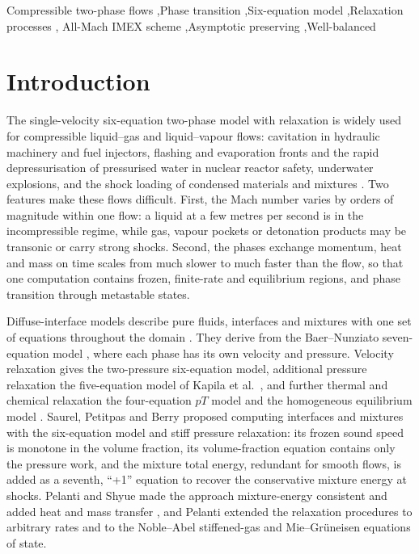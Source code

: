\begin{keyword}
Compressible two-phase flows \sep Phase transition \sep Six-equation model \sep Relaxation processes \sep
All-Mach IMEX scheme \sep Asymptotic preserving \sep Well-balanced
\end{keyword}

\section{Introduction}
\label{sec:intro}

The single-velocity six-equation two-phase model with relaxation \cite{SPB2009,PelantiShyue2014,Pelanti2022} is widely
used for compressible liquid--gas and liquid--vapour flows: cavitation in hydraulic machinery and fuel injectors,
flashing and evaporation fronts and the rapid depressurisation of pressurised water in nuclear reactor safety,
underwater explosions, and the shock loading of condensed materials and mixtures
\cite{SaurelPetitpasAbgrall2008,Bartak1990,PelantiShyue2019,Chiapolino2017,DeLorenzo2018,DeLorenzo2019,Schmidmayer2020,SaurelPantano2018}.
Two features make these flows difficult. First, the Mach number varies by orders of magnitude within one flow: a liquid
at a few metres per second is in the incompressible regime, while gas, vapour pockets or detonation products may be
transonic or carry strong shocks. Second, the phases exchange momentum, heat and mass on time scales from much slower to
much faster than the flow, so that one computation contains frozen, finite-rate and equilibrium regions, and phase
transition through metastable states.

Diffuse-interface models describe pure fluids, interfaces and mixtures with one set of equations throughout the domain
\cite{SaurelAbgrall1999a,AbgrallKarni2001,SaurelPantano2018}. They derive from the Baer--Nunziato seven-equation model
\cite{BaerNunziato1986}, where each phase has its own velocity and pressure. Velocity relaxation gives the two-pressure
six-equation model, additional pressure relaxation the five-equation model of Kapila et al.\
\cite{Kapila2001,MurroneGuillard2005,AllaireClercKokh2002}, and further thermal and chemical relaxation the
four-equation $pT$ model and the homogeneous equilibrium model \cite{FlattenLund2011,Lund2012,Pelanti2022}. Saurel,
Petitpas and Berry \cite{SPB2009} proposed computing interfaces and mixtures with the six-equation model and stiff
pressure relaxation: its frozen sound speed is monotone in the volume fraction, its volume-fraction equation contains
only the pressure work, and the mixture total energy, redundant for smooth flows, is added as a seventh, ``+1'' equation
to recover the conservative mixture energy at shocks. Pelanti and Shyue \cite{PelantiShyue2014} made the approach
mixture-energy consistent and added heat and mass transfer \cite{SaurelPetitpasAbgrall2008,Zein2010}, and Pelanti
\cite{Pelanti2022} extended the relaxation procedures to arbitrary rates and to the Noble--Abel stiffened-gas
\cite{LeMetayerSaurel2016} and Mie--Gr\"uneisen equations of state.

